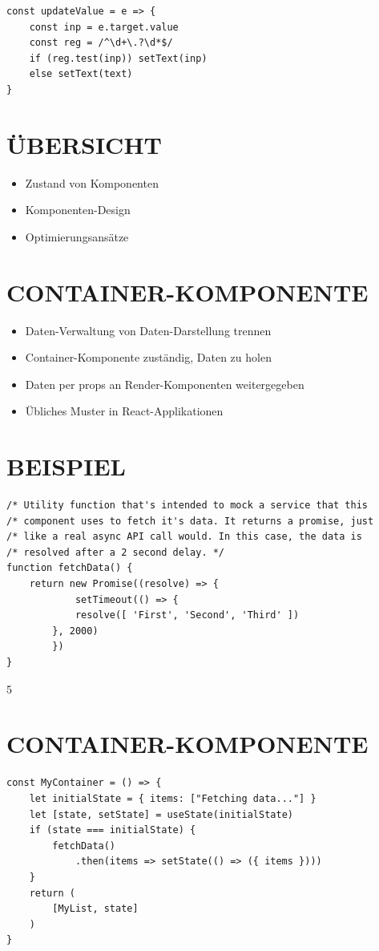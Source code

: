 \begin{verbatim}
const updateValue = e => {
    const inp = e.target.value
    const reg = /^\d+\.?\d*$/
    if (reg.test(inp)) setText(inp)
    else setText(text)
}
\end{verbatim}

\section*{ÜBERSICHT}
\begin{itemize}
  \item Zustand von Komponenten
  \item Komponenten-Design
  \item Optimierungsansätze
\end{itemize}

\section*{CONTAINER-KOMPONENTE}
\begin{itemize}
  \item Daten-Verwaltung von Daten-Darstellung trennen
  \item Container-Komponente zuständig, Daten zu holen
  \item Daten per props an Render-Komponenten weitergegeben
  \item Übliches Muster in React-Applikationen
\end{itemize}

\section*{BEISPIEL}
\begin{verbatim}
/* Utility function that's intended to mock a service that this
/* component uses to fetch it's data. It returns a promise, just
/* like a real async API call would. In this case, the data is
/* resolved after a 2 second delay. */
function fetchData() {
    return new Promise((resolve) => {
            setTimeout(() => {
            resolve([ 'First', 'Second', 'Third' ])
        }, 2000)
        })
}
\end{verbatim}

5

\section*{CONTAINER-KOMPONENTE}
\begin{verbatim}
const MyContainer = () => {
    let initialState = { items: ["Fetching data..."] }
    let [state, setState] = useState(initialState)
    if (state === initialState) {
        fetchData()
            .then(items => setState(() => ({ items })))
    }
    return (
        [MyList, state]
    )
}
\end{verbatim}

